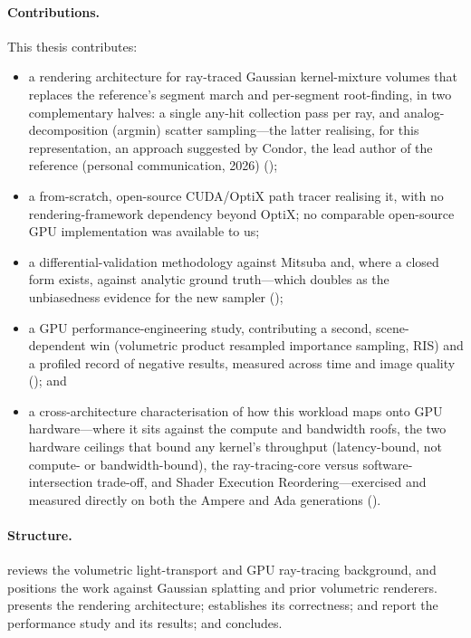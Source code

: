 \paragraph{Contributions.} This thesis contributes:
\begin{itemize}
  \item a rendering architecture for ray-traced Gaussian kernel-mixture volumes that
  replaces the reference's segment march and per-segment root-finding, in two complementary
  halves: a single any-hit collection pass per ray, and analog-decomposition (argmin)
  scatter sampling---the latter realising, for this representation, an approach suggested by
  Condor, the lead author of the reference (personal communication, 2026)
  ();
  \item a from-scratch, open-source CUDA/OptiX path tracer realising it, with no
  rendering-framework dependency beyond OptiX; no comparable open-source GPU implementation
  was available to us;
  \item a differential-validation methodology against Mitsuba and, where a closed form exists, against
  analytic ground truth---which doubles as the unbiasedness evidence for the new sampler
  ();
  \item a GPU performance-engineering study, contributing a second, scene-dependent win
(volumetric product resampled importance sampling, RIS) and a profiled record of negative
results, measured across time and image quality (); and
  \item a cross-architecture characterisation of how this workload maps onto GPU
  hardware---where it sits against the compute and bandwidth roofs, the two hardware
ceilings that bound any kernel's throughput (latency-bound, not compute- or
bandwidth-bound), the ray-tracing-core versus software-intersection trade-off,
  and Shader Execution Reordering---exercised and measured directly on both the Ampere and
  Ada generations ().
\end{itemize}

\paragraph{Structure.}  reviews the volumetric light-transport and GPU ray-tracing
background, and  positions the work against Gaussian splatting and prior
volumetric renderers.  presents the rendering architecture; 
establishes its correctness;  and  report the performance study
and its results; and  concludes.

